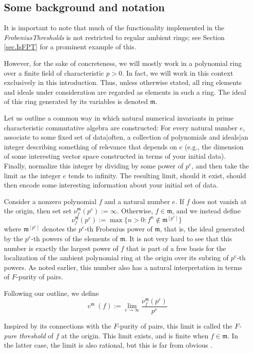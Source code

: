 \documentclass{amsart}
\newcommand{\ft}{\operatorname{c}}
\newcommand{\idealm}{\mathfrak{m}}
\begin{document}
\subsection*{Some background and notation}
It is important to note that much of the functionality implemented in the \emph{FrobeniusThresholds} is not restricted to regular ambient rings; see Section \ref{sec.IsFPT} for a prominent example of this.

However, for the sake of concreteness, we will mostly work in a polynomial ring over a finite field of  characteristic $p>0$.  In fact,  we will work in this context exclusively in this introduction.  Thus, unless otherwise stated, all ring elements and ideals under consideration are regarded as elements in such a ring.  The ideal of this ring generated by its variables is denoted $\idealm$.

Let us outline a common way in which natural numerical invariants in prime characteristic commutative algebra are constructed:  For every natural number $e$, associate to some fixed set of data|often, a collection of polynomials and ideals|an integer describing something of relevance that depends on $e$ (e.g., the dimension of some interesting vector space constructed in terms of your initial data).   Finally, normalize this integer by dividing by some power of $p^e$, and then take the limit as the integer $e$ tends to infinity.  The resulting limit, should it exist, should then encode some interesting information about your initial set of data.

Consider a nonzero polynomial $f$ and a natural number $e$.  If $f$ does not vanish at the origin, then set set $\nu_f^{\idealm}(p^e) := \infty$.  Otherwise, $f \in \idealm$, and we instead define
\[ \nu_f^{\idealm}(p^e) := \max \{ n>0 : f^n \notin \idealm^{[p^e]} \} \]
where $\idealm^{[p^e]}$ denotes the $p^e$-th Frobenius power of $\idealm$, that is, the ideal generated by the $p^e$-th powers of the elements of $\idealm$.    It is not very hard to see that this number is exactly the largest power of $f$ that is part of a free basis for the localization of the ambient polynomial ring at the origin over its subring of $p^e$-th powers.  As noted earlier, this number also has a natural interpretation in terms of $F$-purity of pairs.

Following our outline, we define
\[ \ft^{\idealm}(f) := \lim_{e \to \infty} \frac{ \nu_f^{\idealm}(p^e)}{p^e} \]

Inspired by its connections with the $F$-purity of pairs,  this limit is called the \emph{$F$-pure threshold} of $f$ at the origin.  This limit exists, and is finite when $f \in \idealm$.  In the latter case, the limit is also rational, but this is far from obvious  \cite{BlickleMustataSmithDiscretenessAndRationalityOfFThresholds}.
\end{document}
